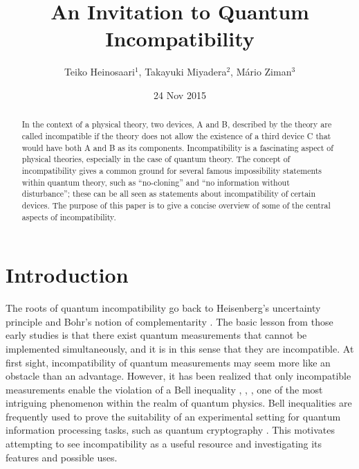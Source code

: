 \documentclass[12pt]{article}
\theoremstyle{definition}
\begin{document}
\setlength{\arraycolsep}{2pt}

\title{An Invitation to Quantum Incompatibility}

\author{
Teiko Heinosaari$^1$,
Takayuki Miyadera$^2$,
M\'ario Ziman$^3$
}

\date{24 Nov 2015}
\maketitle

\begin{abstract} 
In the context of a physical theory, two devices, A and B, described by the theory are called incompatible if the theory does not allow the existence of a third device C that would have both A and B as its components.
Incompatibility is a fascinating aspect of physical theories, especially in the case of quantum theory. 
The concept of incompatibility gives a common ground for several famous impossibility statements within quantum theory, such as ``no-cloning'' and ``no information without disturbance''; these can be all seen as statements about incompatibility of certain devices.
The purpose of this paper is to give a concise overview of some of the central aspects of incompatibility. 
\end{abstract}

\newpage
\section{Introduction}\label{sec:intro}

The roots of quantum incompatibility go back to Heisenberg's uncertainty principle \cite{Heisenberg27} and Bohr's notion of complementarity \cite{Bohr28}. 
The basic lesson from those early studies is that there exist quantum measurements that cannot be implemented simultaneously, and it is in this sense that they are incompatible. 
At first sight, incompatibility of quantum measurements may seem more like an obstacle than an advantage. 
However, it has been realized that only incompatible measurements enable the violation of a Bell inequality \cite{Fine82}, \cite{MaAcGi06}, \cite{WoPeFe09}, one of the most intriguing phenomenon within the realm of quantum physics.
Bell inequalities are frequently used to prove the suitability of an experimental setting for quantum information processing tasks, such as quantum cryptography \cite{BrCaPiScWe14}.
This motivates attempting to see incompatibility as a useful resource and investigating its features and possible uses. 
\end{document}
